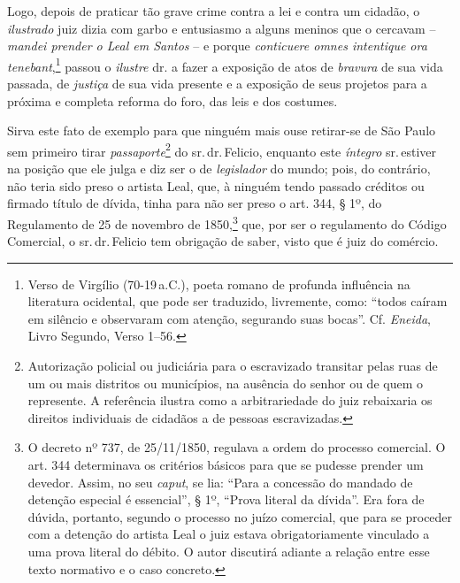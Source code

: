 Logo, depois de praticar tão grave crime contra a lei e contra um
cidadão, o \emph{ilustrado} juiz dizia com garbo e entusiasmo a alguns
meninos que o cercavam -- \emph{mandei prender o Leal em Santos} -- e
porque \emph{conticuere omnes intentique ora tenebant},\footnote{ Verso
  de Virgílio (70-19\,a.C.), poeta romano de profunda influência na
  literatura ocidental, que pode ser traduzido, livremente, como: ``todos
  caíram em silêncio e observaram com atenção, segurando suas bocas''.
  Cf. \emph{Eneida}, Livro Segundo, Verso 1--56.} passou o \emph{ilustre}
dr. a fazer a exposição de atos de \emph{bravura} de sua vida passada,
de \emph{justiça} de sua vida presente e a exposição de seus projetos
para a próxima e completa reforma do foro, das leis e dos costumes.

Sirva este fato de exemplo para que ninguém mais ouse retirar-se de São
Paulo sem primeiro tirar \emph{passaporte}\footnote{ Autorização
  policial ou judiciária para o escravizado transitar pelas ruas de um
  ou mais distritos ou municípios, na ausência do senhor ou de quem o
  represente. A referência ilustra como a arbitrariedade do juiz
  rebaixaria os direitos individuais de cidadãos a de pessoas
  escravizadas.} do sr.\,dr.\,Felicio, enquanto este \emph{íntegro} sr.\,estiver na posição que ele julga e diz ser o de \emph{legislador} do
mundo; pois, do contrário, não teria sido preso o artista Leal, que, à
ninguém tendo passado créditos ou firmado título de dívida, tinha para
não ser preso o art. 344, § 1º, do Regulamento de 25 de novembro de
1850,\footnote{ O decreto nº 737, de 25/11/1850, regulava a ordem do
  processo comercial. O art. 344 determinava os critérios básicos para
  que se pudesse prender um devedor. Assim, no seu \emph{caput}, se lia:
  ``Para a concessão do mandado de detenção especial é essencial'', § 1º,
  ``Prova literal da dívida''. Era fora de dúvida, portanto, segundo o
  processo no juízo comercial, que para se proceder com a detenção do
  artista Leal o juiz estava obrigatoriamente vinculado a uma prova
  literal do débito. O autor discutirá adiante a relação entre esse
  texto normativo e o caso concreto.} que, por ser o regulamento do
Código Comercial, o sr.\,dr.\,Felicio tem obrigação de saber, visto que é
juiz do comércio.

